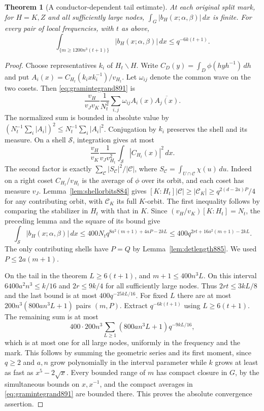 \documentclass[a4paper,11pt]{article}
\newtheorem{theorem}[proposition]{Theorem}
\theoremstyle{definition}
\theoremstyle{remark}
\numberwithin{equation}{section}
\begin{document}
\begin{theorem}[A conductor-dependent tail estimate]
\leavevmode\label{thm:gramtail891}
At each original split mark, for \(H=K,Z\) and all sufficiently
large nodes, \(\int_G |b_H(x;\alpha,\beta)|\,dx\) is finite.
For every pair of local frequencies, with \(t\) as above,
\begin{equation}
 \int_{\{m\ge1200n^3(t+1)\}}\!|b_H(x;\alpha,\beta)|\,dx
                         \le q^{-6k(t+1)} .
 \label{eq:gramtail891}
\end{equation}
\end{theorem}
\begin{proof}
Choose representatives \(k_i\) of \(H_t\backslash H\). Write
\(C_D(y)=\int_D\phi(hyh^{-1})\,dh\) and put
\(A_i(x)=C_{H_t}(k_i x k_i^{-1})/v_{H_t}\).
Let \(\omega_{ij}\) denote the common wave on the two cosets.
Then \eqref{eq:gramintegrand891} is
\[
 \frac{v_H}{v_Jv_K}\frac1{N_t^2}
       \sum_{i,j}\omega_{ij}A_i(x)\overline{A_j(x)} .
\]
The normalized sum is bounded in absolute value by
\((N_t^{-1}\sum_i |A_i|)^2\le N_t^{-1}\sum_i |A_i|^2\).
Conjugation by \(k_i\) preserves the shell and its measure.
On a shell \(\mathcal S\), integration gives at most
\[
 \frac{v_H}{v_K}\frac1{v_Jv_{H_t}^2}
                         \int_{\mathcal S}|C_{H_t}(x)|^2\,dx .
\]
The second factor is exactly
\(\sum_{\mathcal C}|S_{\mathcal C}|^2/|\mathcal C|\), where
\(S_{\mathcal C}=\int_{U\cap\mathcal C}\chi(u)\,du\).
Indeed on a right coset \(C_{H_t}/v_{H_t}\) is the average of
\(\phi\) over its orbit, and each coset has measure \(v_J\).
Lemma~\ref{lem:shellorbits884} gives
\([K:H_t]|\mathcal C|\ge|\mathcal C_K|\ge
 q^{2(d-2a)P}/4\) for any contributing orbit, with \(\mathcal C_K\)
its full \(K\)-orbit. The first inequality follows by comparing
the stabilizer in \(H_t\) with that in \(K\). Since
\((v_H/v_K)[K:H_t]=N_t\), the preceding lemma and the square
of its bound give
\[
 \int_{\mathcal S}|b_H(x;\alpha,\beta)|\,dx
 \le 400N_t q^{8a^2(m+1)+4aP-2kL}
 \le 400q^{2rt+16a^2(m+1)-2kL}.
\]
The only contributing shells have \(P=Q\) by
Lemma~\ref{lem:detlength885}. We used \(P\le 2a(m+1)\).

On the tail in the theorem \(L\ge6(t+1)\), and
\(m+1\le400n^3L\). On this interval \(6400a^2n^3\le k/16\)
and \(2r\le9k/4\) for all sufficiently large nodes. Thus
\(2rt\le3kL/8\) and the last bound is at most \(400q^{-25kL/16}\).
For fixed \(L\) there are at most \(200n^3(800an^3L+1)\) pairs
\((m,P)\). Extract \(q^{-6k(t+1)}\) using \(L\ge6(t+1)\).
The remaining sum is at most
\[
 400\cdot200n^3\sum_{L\ge1}(800an^3L+1)q^{-9kL/16},
\]
which is at most one for all large nodes, uniformly in the
frequency and the mark. This follows by summing the geometric
series and its first moment, since \(q\ge2\) and \(a,n\)
grow polynomially in the interval parameter while \(k\)
grows at least as fast as \(x^5-2\sqrt{x}\).
Every bounded range of \(m\) has compact closure in \(G\),
by the simultaneous bounds on \(x,x^{-1}\), and the compact
averages in \eqref{eq:gramintegrand891} are bounded there.
This proves the absolute convergence assertion.
\end{proof}
\end{document}
